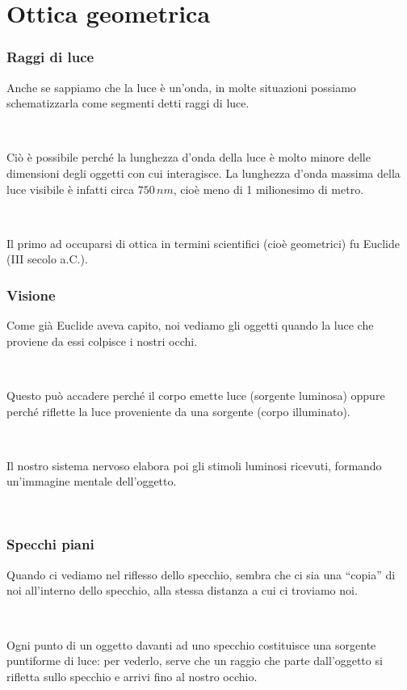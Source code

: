 \documentclass[]{beamer}
\theoremstyle{plain}
\begin{document}
\section{Ottica geometrica}

\begin{frame}
\frametitle{Raggi di luce}
Anche se sappiamo che la luce è un'onda, in molte situazioni possiamo schematizzarla come segmenti detti \alert<1>{raggi di luce}.\pause

~

Ciò è possibile perché la lunghezza d'onda della luce è molto minore delle dimensioni degli oggetti con cui interagisce. La lunghezza d'onda massima della luce visibile è infatti circa $ 750 \, nm $, cioè meno di 1 milionesimo di metro.\pause

~

Il primo ad occuparsi di ottica in termini scientifici (cioè geometrici) fu Euclide (III secolo a.C.).
\end{frame}



\begin{frame}
\frametitle{Visione}
Come già Euclide aveva capito, \alert<1>{noi vediamo gli oggetti quando la luce che proviene da essi colpisce i nostri occhi}.\pause

~

Questo può accadere perché il corpo emette luce (sorgente luminosa) oppure perché riflette la luce proveniente da una sorgente (corpo illuminato).\pause

~

Il nostro sistema nervoso elabora poi gli stimoli luminosi ricevuti, formando un'\alert<3>{immagine mentale} dell'oggetto.

~

\end{frame}



\begin{frame}
\frametitle{Specchi piani}
Quando ci vediamo nel riflesso dello specchio, sembra che ci sia una ``copia'' di noi all'interno dello specchio, alla stessa distanza a cui ci troviamo noi.\pause

~

Ogni punto di un oggetto davanti ad uno specchio costituisce una sorgente puntiforme di luce: per vederlo, serve che un raggio che parte dall'oggetto si rifletta sullo specchio e arrivi fino al nostro occhio.

\end{frame}
\end{document}
